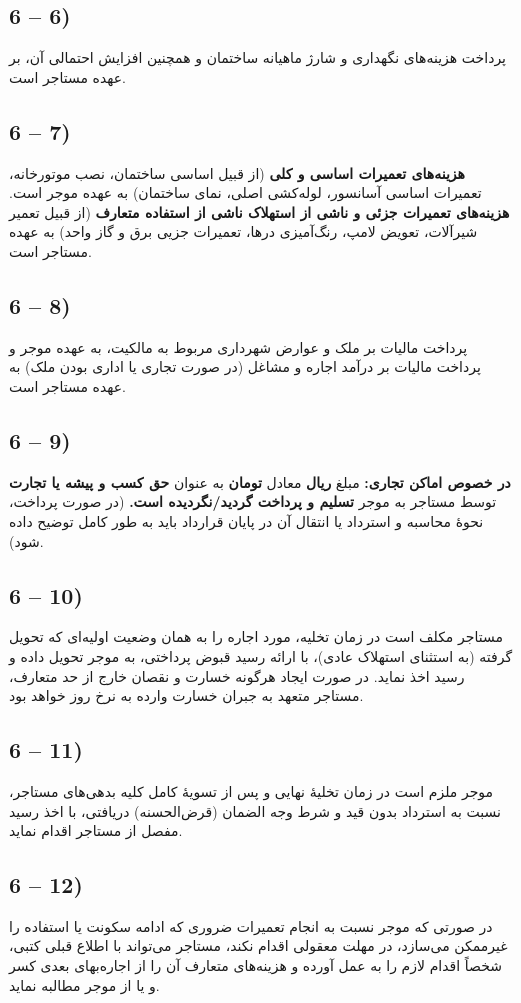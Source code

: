 \documentclass[14pt]{article}
\begin{document}
	\subsection*{6 – 6)}
	پرداخت هزینه‌های نگهداری و شارژ ماهیانه ساختمان و همچنین افزایش احتمالی آن، بر عهده مستاجر است.
	\subsection*{6 – 7)}
	\textbf{هزینه‌های تعمیرات اساسی و کلی} (از قبیل اساسی ساختمان، نصب موتورخانه، تعمیرات اساسی آسانسور، لوله‌کشی اصلی، نمای ساختمان) به عهده موجر است.
	\textbf{هزینه‌های تعمیرات جزئی و ناشی از استهلاک ناشی از استفاده متعارف} (از قبیل تعمیر شیرآلات، تعویض لامپ، رنگ‌آمیزی درها، تعمیرات جزیی برق و گاز واحد) به عهده مستاجر است.
	\subsection*{6 – 8)}
	پرداخت مالیات بر ملک و عوارض شهرداری مربوط به مالکیت، به عهده موجر و پرداخت مالیات بر درآمد اجاره و مشاغل (در صورت تجاری یا اداری بودن ملک) به عهده مستاجر است.
	\subsection*{6 – 9)}
	\textbf{در خصوص اماکن تجاری:} مبلغ
	\underline{\hspace{3cm}}
	\textbf{ریال} معادل
	\underline{\hspace{3cm}}
	\textbf{تومان} به عنوان
	\textbf{حق کسب و پیشه یا تجارت} توسط مستاجر به موجر
	\textbf{تسلیم و پرداخت گردید/نگردیده است.} (در صورت پرداخت، نحوهٔ محاسبه و استرداد یا انتقال آن در پایان قرارداد باید به طور کامل توضیح داده شود).
	\subsection*{6 – 10)}
	مستاجر مکلف است در زمان تخلیه، مورد اجاره را به همان وضعیت اولیه‌ای که تحویل گرفته (به استثنای استهلاک عادی)، با ارائه رسید قبوض پرداختی، به موجر تحویل داده و رسید اخذ نماید. در صورت ایجاد هرگونه خسارت و نقصان خارج از حد متعارف، مستاجر متعهد به جبران خسارت وارده به نرخ روز خواهد بود.
	\subsection*{6 – 11)}
	موجر ملزم است در زمان تخلیهٔ نهایی و پس از تسویهٔ کامل کلیه بدهی‌های مستاجر، نسبت به استرداد بدون قید و شرط وجه الضمان (قرض‌الحسنه) دریافتی، با اخذ رسید مفصل از مستاجر اقدام نماید.
	\subsection*{6 – 12)}
	در صورتی که موجر نسبت به انجام تعمیرات ضروری که ادامه سکونت یا استفاده را غیرممکن می‌سازد، در مهلت معقولی اقدام نکند، مستاجر می‌تواند با اطلاع قبلی کتبی، شخصاً اقدام لازم را به عمل آورده و هزینه‌های متعارف آن را از اجاره‌بهای بعدی کسر و یا از موجر مطالبه نماید.
\end{document}
